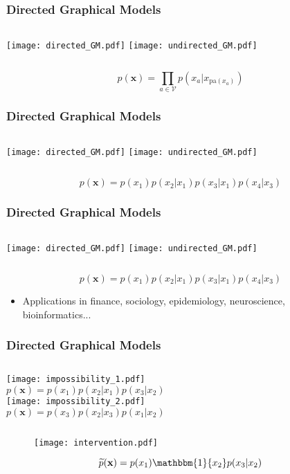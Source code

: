 \documentclass{beamer}
\begin{document}
\begin{frame}
\frametitle{Directed Graphical Models}
\begin{columns}[c]
\column{1.5in}
\texttt{[image: directed\_GM.pdf]}
\column{1.5in}
\texttt{[image: undirected\_GM.pdf]}
\end{columns}
$$p(\mathbf{x}) = \prod_{a \in \mathcal{V}}{p\left(x_a|x_{\text{pa}(x_a)}\right)}$$
\end{frame}


\begin{frame}
\frametitle{Directed Graphical Models}
\begin{columns}[c]
\column{1.5in}
\texttt{[image: directed\_GM.pdf]}
\column{1.5in}
\texttt{[image: undirected\_GM.pdf]}
\end{columns}
$$p(\mathbf{x}) = p(x_1)p(x_2|x_1)p(x_3|x_1)p(x_4|x_3)$$
\end{frame}

\begin{frame}
\frametitle{Directed Graphical Models}
\begin{columns}[c]
\column{1.4in}
\texttt{[image: directed\_GM.pdf]}
\column{1.4in}
\texttt{[image: undirected\_GM.pdf]}
\end{columns}
$$p(\mathbf{x}) = p(x_1)p(x_2|x_1)p(x_3|x_1)p(x_4|x_3)$$
\begin{itemize}
\item{Applications in finance, sociology, epidemiology, neuroscience, bioinformatics...}
\end{itemize}
\end{frame}

\begin{frame}
\frametitle{Directed Graphical Models}
\begin{columns}[c]
\column{2.0in}
\centering
\texttt{[image: impossibility\_1.pdf]}
$$p(\mathbf{x}) = p(x_1)p(x_2|x_1)p(x_3|x_2)$$
\column{2.0in}
\centering
\texttt{[image: impossibility\_2.pdf]}
$$p(\mathbf{x}) = p(x_3)p(x_2|x_3)p(x_1|x_2)$$
\end{columns}
\begin{figure}
	\centering
		\texttt{[image: intervention.pdf]}
	\label{fig:2}
\end{figure}
$$\widetilde{p}(\mathbf{x}) = p(x_1)\mathbbm{1}\{x_2\}p(x_3|x_2)$$
\end{frame}
\end{document}
